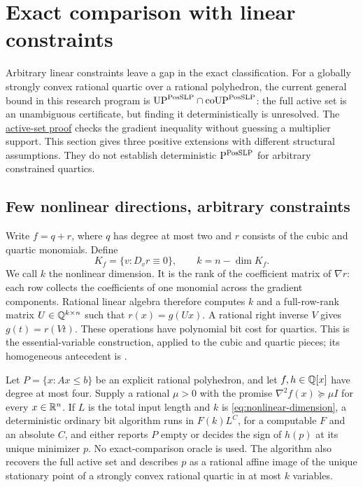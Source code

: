 \section{Exact comparison with linear constraints}
\label{sec:constrained}

Arbitrary linear constraints leave a gap in the exact classification.
For a globally strongly convex rational quartic over a rational
polyhedron, the current general bound in this research program is
$\mathrm{UP}^{\mathrm{PosSLP}}\cap\mathrm{coUP}^{\mathrm{PosSLP}}$: the full active
set is an unambiguous certificate, but finding it deterministically is
unresolved. The
\href{../../research-20260927/polyhedral-strong-quartic-unambiguous-upper.md}{active-set proof}
checks the gradient inequality without guessing a multiplier support.
This section gives three positive extensions with different structural
assumptions. They do not establish deterministic
$\mathrm P^{\mathrm{PosSLP}}$ for arbitrary constrained quartics.

\subsection{Few nonlinear directions, arbitrary constraints}

Write $f=q+r$, where $q$ has degree at most two and $r$ consists of the
cubic and quartic monomials. Define
\begin{equation}
 K_f=\{v:D_vr\equiv0\},\qquad k=n-\dim K_f.
 \label{eq:nonlinear-dimension}
\end{equation}
We call $k$ the nonlinear dimension. It is the rank of the coefficient
matrix of $\nabla r$: each row collects the coefficients of one monomial
across the gradient components. Rational linear algebra therefore computes
$k$ and a full-row-rank matrix $U\in\mathbb Q^{k\times n}$ such that
$r(x)=g(Ux)$. A rational right inverse $V$ gives $g(t)=r(Vt)$.
These operations have polynomial bit cost for quartics. This is the
essential-variable construction, applied to the cubic and quartic pieces;
its homogeneous antecedent is \citet[Proposition~1]{Carlini2006}.

\begin{theorem}
\label{thm:nonlinear-dimension}
Let $P=\{x:Ax\le b\}$ be an explicit rational polyhedron, and let
$f,h\in\mathbb Q[x]$ have degree at most four. Supply a rational $\mu>0$
with the promise $\nabla^2f(x)\succeq\mu I$ for every $x\in\mathbb R^n$.
If $L$ is the total input length and $k$ is
\eqref{eq:nonlinear-dimension}, a deterministic ordinary bit algorithm
runs in $F(k)L^C$, for a computable $F$ and an absolute $C$, and either
reports $P$ empty or decides the sign of $h(p)$ at its unique minimizer
$p$. No exact-comparison oracle is used. The algorithm also recovers the
full active set and describes $p$ as a rational affine image of the
unique stationary point of a strongly convex rational quartic in at
most $k$ variables.
\end{theorem}

